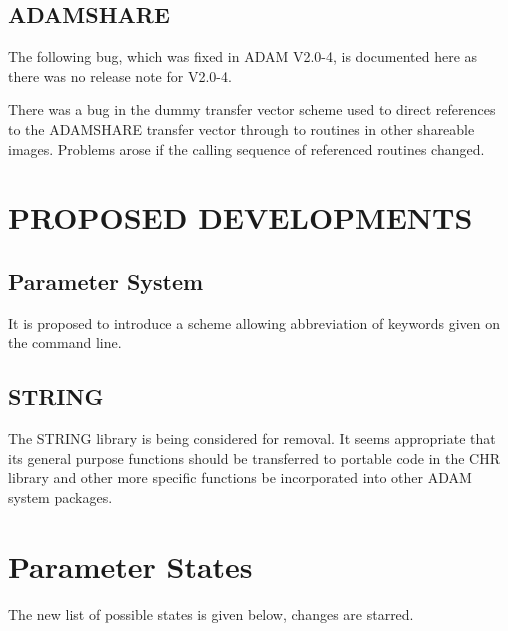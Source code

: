 \subsection{ADAMSHARE}
The following bug, which was fixed in ADAM V2.0-4, is documented here as
there was no release note for V2.0-4.

There was a bug in the dummy transfer vector scheme used to direct
references to the ADAM\-SHARE transfer vector through to routines in other
shareable images. Problems arose if the calling sequence of referenced routines
changed.

\section{PROPOSED DEVELOPMENTS}
\subsection{Parameter System}
It is proposed to introduce a scheme allowing abbreviation of keywords given 
on the command line.
\subsection{STRING}
The STRING library is being considered for removal. It seems appropriate that
its general purpose functions should be transferred to portable code in the
CHR library and other more specific functions be incorporated into other
ADAM system packages.

\newpage
\appendix
\section{Parameter States}
\label{states}
The new list of possible states is given below, changes are starred.

